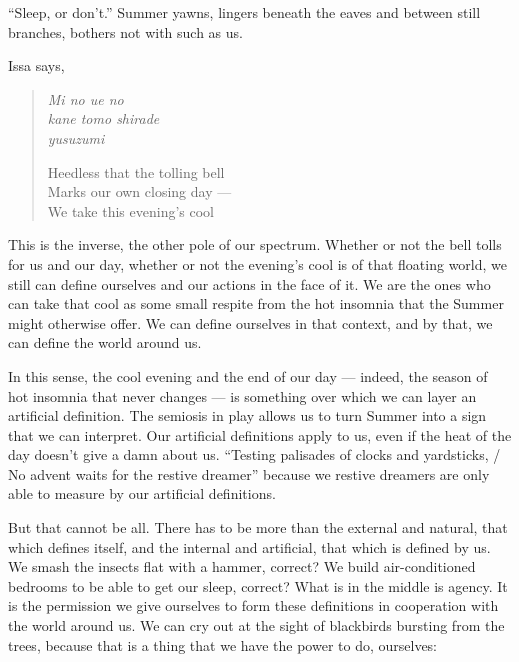 ``Sleep, or don't.'' Summer yawns, lingers beneath the eaves and between still branches, bothers not with such as us.\pagebreak

Issa says,

\begin{verse}
\begin{multicols}{2}
\emph{Mi no ue no} \\
\emph{kane tomo shirade} \\
\emph{yusuzumi} 

\columnbreak

Heedless that the tolling bell \\
Marks our own closing day --- \\
We take this evening's cool
\end{multicols}
\vspace{-1em}
\parencite[39]{issa}
\end{verse}

This is the inverse, the other pole of our spectrum. Whether or not the bell tolls for us and our day, whether or not the evening's cool is of that floating world, we still can define ourselves and our actions in the face of it. We are the ones who can take that cool as some small respite from the hot insomnia that the Summer might otherwise offer. We can define ourselves in that context, and by that, we can define the world around us.

In this sense, the cool evening and the end of our day --- indeed, the season of hot insomnia that never changes --- is something over which we can layer an artificial definition. The semiosis in play allows us to turn Summer into a sign that we can interpret. Our artificial definitions apply to us, even if the heat of the day doesn't give a damn about us. ``Testing palisades of clocks and yardsticks, / No advent waits for the restive dreamer'' because we restive dreamers are only able to measure by our artificial definitions.

But that cannot be all. There has to be more than the external and natural, that which defines itself, and the internal and artificial, that which is defined by us. We smash the insects flat with a hammer, correct? We build air-conditioned bedrooms to be able to get our sleep, correct? What is in the middle is agency. It is the permission we give ourselves to form these definitions in cooperation with the world around us. We can cry out at the sight of blackbirds bursting from the trees, because that is a thing that we have the power to do, ourselves:

